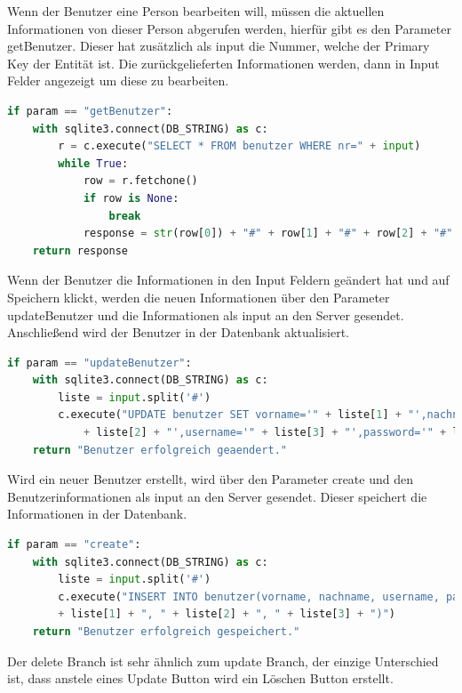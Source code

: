 Wenn der Benutzer eine Person bearbeiten will, müssen die aktuellen Informationen von dieser Person abgerufen werden, hierfür gibt es den Parameter getBenutzer. Dieser hat zusätzlich als input die Nummer, welche der Primary Key der Entität ist. Die zurückgelieferten Informationen werden, dann in Input Felder angezeigt um diese zu bearbeiten.

\begin{lstlisting}[language=Python, caption=Auslesen eines Benutzer aus der Datenbank]
if param == "getBenutzer":
	with sqlite3.connect(DB_STRING) as c:
		r = c.execute("SELECT * FROM benutzer WHERE nr=" + input)
		while True:
			row = r.fetchone()
			if row is None:
				break
			response = str(row[0]) + "#" + row[1] + "#" + row[2] + "#" + row[3] + "#" + row[4];
	return response
\end{lstlisting}

Wenn der Benutzer die Informationen in den Input Feldern geändert hat und auf Speichern klickt, werden die neuen Informationen über den Parameter updateBenutzer und die Informationen als input an den Server gesendet. Anschließend wird der Benutzer in der Datenbank aktualisiert.

\begin{lstlisting}[language=Python, caption=Updaten der Benutzerinformationen]
if param == "updateBenutzer":
	with sqlite3.connect(DB_STRING) as c:
		liste = input.split('#')
		c.execute("UPDATE benutzer SET vorname='" + liste[1] + "',nachname='"
			+ liste[2] + "',username='" + liste[3] + "',password='" + liste[4] + "' WHERE nr=" + liste[0])
	return "Benutzer erfolgreich geaendert."
\end{lstlisting}

Wird ein neuer Benutzer erstellt, wird über den Parameter create und den Benutzerinformationen als input an den Server gesendet. Dieser speichert die Informationen in der Datenbank.

\begin{lstlisting}[language=Python, caption=Updaten der Benutzerinformationen]
if param == "create":
	with sqlite3.connect(DB_STRING) as c:
		liste = input.split('#')
		c.execute("INSERT INTO benutzer(vorname, nachname, username, password) VALUES (" + liste[0] + ", "
		+ liste[1] + ", " + liste[2] + ", " + liste[3] + ")")
	return "Benutzer erfolgreich gespeichert."
\end{lstlisting}

Der delete Branch ist sehr ähnlich zum update Branch, der einzige Unterschied ist, dass anstele eines Update Button wird ein Löschen Button erstellt.

